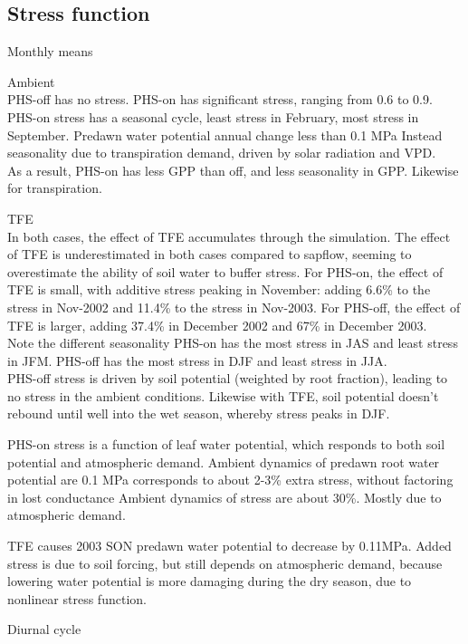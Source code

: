 \documentclass[draft,linenumbers]{agujournal}
\begin{document}
\subsection{Stress function}

Monthly means

Ambient \\
PHS-off has no stress. PHS-on has significant stress, ranging from 0.6 to 0.9.
PHS-on stress has a seasonal cycle, least stress in February, most stress in September.
Predawn water potential annual change less than 0.1 MPa
Instead seasonality due to transpiration demand, driven by solar radiation and VPD. \\
As a result, PHS-on has less GPP than off, and less seasonality in GPP. Likewise for transpiration.

TFE \\
In both cases, the effect of TFE accumulates through the simulation. 
The effect of TFE is underestimated in both cases compared to sapflow, seeming to overestimate the ability of soil water to buffer stress.
For PHS-on, the effect of TFE is small, with additive stress peaking in November: adding 6.6\% to the stress in Nov-2002 and 11.4\% to the stress in Nov-2003.
For PHS-off, the effect of TFE is larger, adding 37.4\% in December 2002  and 67\% in December 2003. \\
Note the different seasonality
PHS-on has the most stress in JAS and least stress in JFM. 
PHS-off has the most stress in DJF and least stress in JJA. \\

PHS-off stress is driven by soil potential (weighted by root fraction), leading to no stress in the ambient conditions.
Likewise with TFE, soil potential doesn't rebound until well into the wet season, whereby stress peaks in DJF.

PHS-on stress is a function of leaf water potential, which responds to both soil potential and atmospheric demand. 
Ambient dynamics of predawn root water potential are 0.1 MPa corresponds to about 2-3\% extra stress, without factoring in lost conductance
Ambient dynamics of stress are about 30\%. Mostly due to atmospheric demand.

TFE causes 2003 SON predawn water potential to decrease by 0.11MPa. 
Added stress is due to soil forcing, but still depends on atmospheric demand, 
because lowering water potential is more damaging during the dry season,
due to nonlinear stress function.

Diurnal cycle
\end{document}
